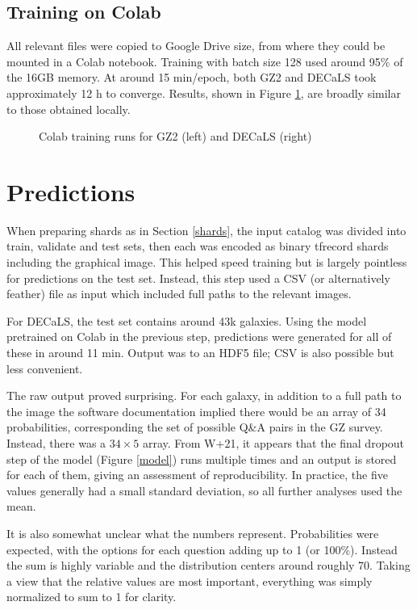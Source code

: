 \documentclass[preprint]{aastex631}
\newcommand{\todo}{\color{red}{TODO}\color{black}\hspace{2mm}}
\begin{document}
\subsection{Training on Colab}

All relevant files were copied to Google Drive \todo size, from where they could be mounted in a Colab notebook. Training with batch size 128 used around 95\% of the 16GB memory. At around 15 min/epoch, both GZ2 and DECaLS took approximately 12 h to converge. Results, shown in Figure \ref{fig:train_colab}, are broadly similar to those obtained locally.

\begin{figure}
	\caption{Colab training runs for GZ2 (left) and DECaLS (right) \label{fig:train_colab}}
\end{figure}


\section{Predictions} \label{sec:predictions}

When preparing shards as in Section \ref{shards}, the input catalog was divided into train, validate and test sets, then each was encoded as binary tfrecord shards including the graphical image. This helped speed training but is largely pointless for predictions on the test set. Instead, this step used a CSV (or alternatively feather) file as input which included full paths to the relevant images.

For DECaLS, the test set contains around 43k galaxies. Using the model pretrained on Colab in the previous step, predictions were generated for all of these in around 11 min. Output was to an HDF5 file; CSV is also possible but less convenient.

The raw output proved surprising. For each galaxy, in addition to a full path to the image the software documentation implied there would be an array of 34 probabilities, corresponding the set of possible Q\&A pairs in the GZ survey. Instead, there was a $34 \times 5$ array. From W+21, it appears that the final dropout step of the model (Figure \ref{model}) runs multiple times and an output is stored for each of them, giving an assessment of reproducibility. In practice, the five values generally had a small standard deviation, so all further analyses used the mean.

It is also somewhat unclear what the numbers represent. Probabilities were expected, with the options for each question adding up to 1 (or  100\%). Instead the sum is highly variable and the distribution centers around roughly 70. Taking a view that the relative values are most important, everything was simply normalized to sum to 1 for clarity. 
\end{document}
